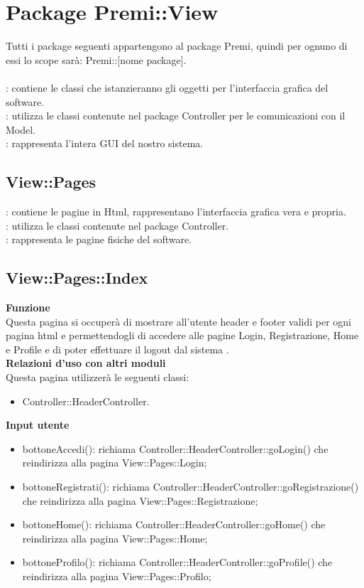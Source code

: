 \section{Package Premi::View}{
	Tutti i package seguenti appartengono al package Premi, quindi per ognuno di essi lo scope sarà: Premi::[nome package]. \\\\
	\textbf{\tipo}: contiene le classi che istanzieranno gli oggetti per l'interfaccia grafica del software.\\
	\textbf{\relaz}: utilizza le classi contenute nel package Controller per le comunicazioni con il Model.\\
	\textbf{\attivita}: rappresenta l'intera GUI del nostro sistema.
\subsection{View::Pages}{
\textbf{\tipo}: contiene le pagine in Html, rappresentano l'interfaccia grafica vera e propria.\\
\textbf{\relaz}: utilizza le classi contenute nel package Controller.\\
\textbf{\attivita}: rappresenta le pagine fisiche del software.
}
\subsection{View::Pages::Index}{
	\textbf{Funzione}\\
		\indent Questa pagina si occuperà di mostrare all'utente header e footer validi per ogni pagina html e permettendogli di accedere alle pagine Login, Registrazione, Home e Profile e di poter effettuare il logout dal sistema .\\
	\textbf{Relazioni d'uso con altri moduli}\\
		\indent Questa pagina utilizzerà le seguenti classi:
	\begin{itemize}
		\item Controller::HeaderController.
	\end{itemize}
	\textbf{Input utente}
		\begin{itemize}
		\item bottoneAccedi(): richiama Controller::HeaderController::goLogin() che reindirizza alla pagina View::Pages::Login;
		\item bottoneRegistrati(): richiama Controller::HeaderController::goRegistrazione() che reindirizza alla pagina View::Pages::Registrazione;
		\item bottoneHome(): richiama Controller::HeaderController::goHome() che reindirizza alla pagina View::Pages::Home;
		\item bottoneProfilo(): richiama Controller::HeaderController::goProfile() che reindirizza alla pagina View::Pages::Profilo;
	\end{itemize}
	}
}
